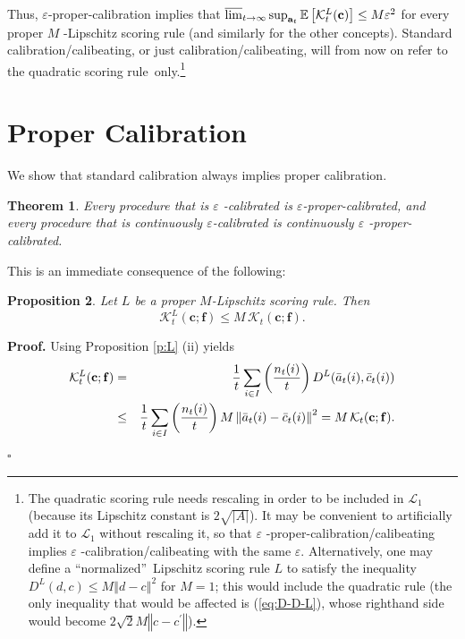 \documentclass[12pt,a4paper,notitlepage]{article}
\newtheorem{theorem}{Theorem}
\newtheorem{proposition}[theorem]{Proposition}
\newenvironment{proof}[1][Proof]{\noindent\textbf{#1.} }{\hfill $\square$}
\begin{document}
Thus, $\varepsilon $-proper-calibration implies that $\varlimsup_{t%
\rightarrow \infty }\sup_{\mathbf{a}_{t}}\mathbb{E}\left[ \mathcal{K}%
_{t}^{L}(\mathbf{c})\right] \leq M\varepsilon ^{2}$ for every proper $M$%
-Lipschitz scoring rule (and similarly for the other concepts). Standard
calibration/calibeating, or just calibration/calibeating, will from now on
refer to the quadratic scoring rule\ only.\footnote{%
The quadratic scoring rule needs rescaling in order to be included in $%
\mathcal{L}_{1}$ (because its Lipschitz constant is $2\sqrt{\left\vert
A\right\vert }$). It may be convenient to artificially add it to $\mathcal{L}%
_{1}$ without rescaling it, so that $\varepsilon $%
-proper-calibration/calibeating implies $\varepsilon $%
-calibration/calibeating with the same $\varepsilon $. Alternatively, one
may define a \textquotedblleft normalized\textquotedblright\ Lipschitz
scoring rule $L$ to satisfy the inequality $D^{L}(d,c)\leq M\left\Vert
d-c\right\Vert ^{2}$ for $M=1$; this would include the quadratic rule (the
only inequality that would be affected is (\ref{eq:D-D-L}), whose righthand
side would become $2\sqrt{2}M\left\Vert c-c^{\prime }\right\Vert $).}

\section{Proper Calibration\label{s:proper calibration}}

We show that standard calibration always implies proper calibration.

\begin{theorem}
\label{th:proper-calibration}Every procedure that is $\varepsilon $%
-calibrated is $\varepsilon $-\emph{proper}-calibrated, and every procedure
that is continuously $\varepsilon $-calibrated is continuously $\varepsilon $%
-\emph{proper}-calibrated.
\end{theorem}

\bigskip

This is an immediate consequence of the following:

\begin{proposition}
\label{p:K-KS}Let $L$ be a proper $M$-Lipschitz scoring rule. Then%
\begin{equation*}
\mathcal{K}_{t}^{L}(\mathbf{c};\mathbf{f})\leq M\,\mathcal{K}_{t}(\mathbf{c};%
\mathbf{f}).
\end{equation*}
\end{proposition}

\begin{proof}
Using Proposition \ref{p:L} (ii) yields 
\begin{eqnarray}
\mathcal{K}_{t}^{L}(\mathbf{c};\mathbf{f}) &=&\frac{1}{t}\sum_{i\in I}\left( 
\frac{n_{t}(i)}{t}\right) D^{L}(\bar{a}_{t}(i),\bar{c}_{t}(i))
\label{eq:KS vs K} \\
&\leq &\frac{1}{t}\sum_{i\in I}\left( \frac{n_{t}(i)}{t}\right) M\left\Vert 
\bar{a}_{t}(i)-\bar{c}_{t}(i)\right\Vert ^{2}=M\,\mathcal{K}_{t}(\mathbf{c};%
\mathbf{f}).  \notag
\end{eqnarray}
\end{proof}
\end{document}
